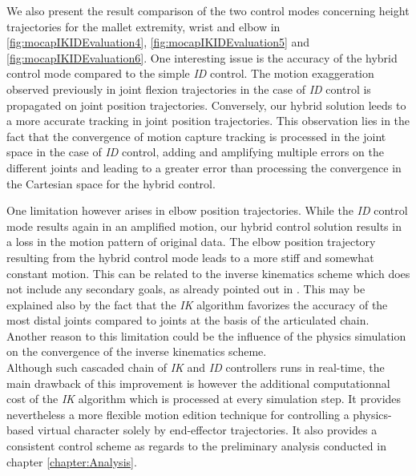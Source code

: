 We also present the result comparison of the two control modes concerning height trajectories for the mallet extremity, wrist and elbow in \myfigname \ref{fig:mocapIKIDEvaluation4}, \ref{fig:mocapIKIDEvaluation5} and \ref{fig:mocapIKIDEvaluation6}. One interesting issue is the accuracy of the hybrid control mode compared to the simple \emph{ID} control. The motion exaggeration observed previously in joint flexion trajectories in the case of \emph{ID} control is propagated on joint position trajectories. Conversely, our hybrid solution leeds to a more accurate tracking in joint position trajectories. This observation lies in the fact that the convergence of motion capture tracking is processed in the joint space in the case of \emph{ID} control, adding and amplifying multiple errors on the different joints and leading to a greater error than processing the convergence in the Cartesian space for the hybrid control.

One limitation however arises in elbow position trajectories. While the \emph{ID} control mode results again in an amplified motion, our hybrid control solution results in a loss in the motion pattern of original data. The elbow position trajectory resulting from the hybrid control mode leads to a more stiff and somewhat constant motion. This can be related to the inverse kinematics scheme which does not include any secondary goals, as already pointed out in . This may be explained also by the fact that the \emph{IK} algorithm favorizes the accuracy of the most distal joints compared to joints at the basis of the articulated chain. Another reason to this limitation could be the influence of the physics simulation on the convergence of the inverse kinematics scheme.\\

Although such cascaded chain of \emph{IK} and \emph{ID} controllers runs in real-time, the main drawback of this improvement is however the additional computationnal cost of the \emph{IK} algorithm which is processed at every simulation step. It provides nevertheless a more flexible motion edition technique for controlling a physics-based virtual character solely by end-effector trajectories. It also provides a consistent control scheme as regards to the preliminary analysis conducted in chapter \ref{chapter:Analysis}.




